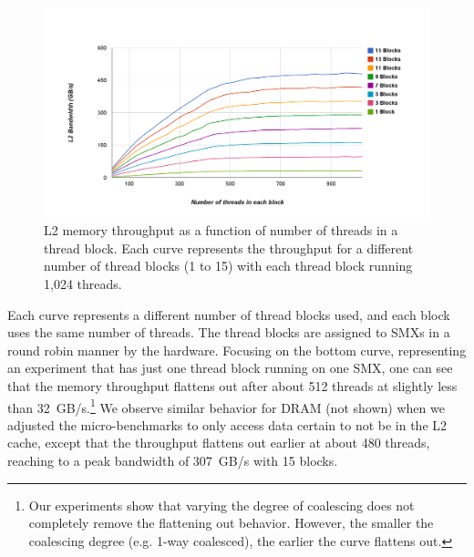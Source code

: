 \begin{figure}
\center
\includegraphics[scale=0.21]{AllInL2MultipleSM4WayColaesced.png}
\caption{\footnotesize\textnormal{L2 memory throughput as a function of number of threads in a thread block. Each curve represents the throughput for a different number of thread blocks (1 to 15) with each thread block running 1,024 threads.}}
\label{fig:MemBandwidth}
\vspace{-0.3cm}
\end{figure}



Each curve represents a different number of thread blocks used, and each block uses the same number of threads.
The thread blocks are assigned to SMXs in a round robin manner by the hardware.
Focusing on the bottom curve, representing an experiment that has just one thread block running on
one SMX, one can see that the memory throughput flattens out after about 512 threads at slightly less
than 32~GB/s.\footnote{
    Our experiments show that varying the degree of coalescing does not completely
    remove the flattening out behavior. 
    However, the smaller the coalescing degree (e.g. 1-way coalesced), the
    earlier the curve flattens out.}
We observe similar behavior for DRAM (not shown) when we adjusted the micro-benchmarks to only access data certain to not be in the L2 cache, except that the throughput flattens out
earlier at about 480 threads, reaching to a peak bandwidth of 307~GB/s with 15 blocks.


